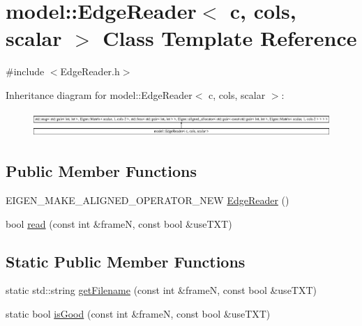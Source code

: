\hypertarget{classmodel_1_1_edge_reader}{}\section{model\+:\+:Edge\+Reader$<$ c, cols, scalar $>$ Class Template Reference}
\label{classmodel_1_1_edge_reader}


{\ttfamily \#include $<$Edge\+Reader.\+h$>$}

Inheritance diagram for model\+:\+:Edge\+Reader$<$ c, cols, scalar $>$\+:\begin{figure}[H]
\begin{center}
\leavevmode
\includegraphics[height=0.972222cm]{classmodel_1_1_edge_reader}
\end{center}
\end{figure}
\subsection*{Public Member Functions}
\begin{DoxyCompactItemize}
\item 
E\+I\+G\+E\+N\+\_\+\+M\+A\+K\+E\+\_\+\+A\+L\+I\+G\+N\+E\+D\+\_\+\+O\+P\+E\+R\+A\+T\+O\+R\+\_\+\+N\+E\+W \hyperlink{classmodel_1_1_edge_reader_a1e84a22bffaf453d6a91c78ed03c2d3d}{Edge\+Reader} ()
\item 
bool \hyperlink{classmodel_1_1_edge_reader_a0695aa23393e064eadb1c98a6bd51e42}{read} (const int \&frame\+N, const bool \&use\+T\+X\+T)
\end{DoxyCompactItemize}
\subsection*{Static Public Member Functions}
\begin{DoxyCompactItemize}
\item 
static std\+::string \hyperlink{classmodel_1_1_edge_reader_a8115edf1929ff8035eab7f7bdcbab739}{get\+Filename} (const int \&frame\+N, const bool \&use\+T\+X\+T)
\item 
static bool \hyperlink{classmodel_1_1_edge_reader_a6b04c6ded4bbcc4184ad711ee98d4050}{is\+Good} (const int \&frame\+N, const bool \&use\+T\+X\+T)
\end{DoxyCompactItemize}


